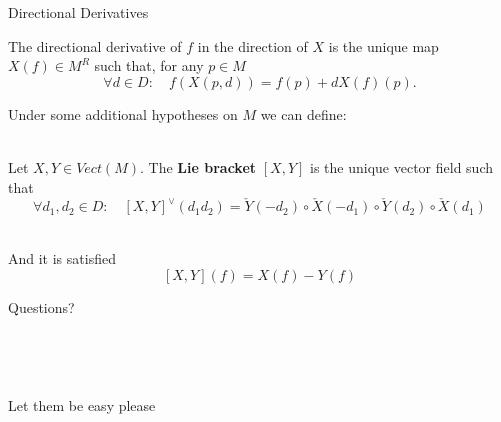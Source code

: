 \documentclass[handout, 11pt]{beamer}
\begin{document}
\begin{frame}{Directional Derivatives}
	\begin{definition} 
		The directional derivative of $f$ in the direction of $X$
		is the unique map $X(f)\in M^R$ such that, for any $p\in M$
		\[\forall d\in D: \quad f(X(p,d))= f(p) + dX(f)(p) .\]			
	\end{definition}
\end{frame}

\begin{frame}
Under some additional hypotheses on $M$ we can define:
\\~\\

\begin{definition}
	Let $X,Y\in Vect(M)$. The \textbf{Lie bracket} $[X,Y]$ is the unique vector 
	field such that
	\[\forall d_1, d_2 \in D: \quad[X,Y]^\vee (d_1d_2)= 
	\check{Y}(-d_2)\circ \check{X}(-d_1)\circ
	\check{Y}(d_2)\circ \check{X}(d_1) \]
\end{definition}
~\\
And it is satisfied 
\[ [X,Y](f)= X(f) - Y(f) \]
\end{frame}

\begin{frame}

\begin{center}
	\Large{Questions?}\\~\\~\\~\\~\\
	\tiny{Let them be easy please}
\end{center}

\end{frame}
\end{document}
